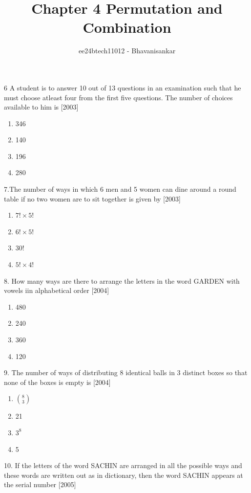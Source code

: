 \documentclass[journal,12pt,twocolumn]{IEEEtran}
\theoremstyle{remark}
\begin{document}

\vspace{3cm}

\title{Chapter 4 Permutation and Combination}
\author{ee24btech11012 - Bhavanisankar}
\maketitle
\newpage
\bigskip

\renewcommand{\thefigure}{\theenumi}
\renewcommand{\thetable}{\theenumi}

 6 A student is to answer 10 out of 13 questions in an examination such that he must choose atleast four from the first five questions. The number of choices available to him is  \hfill[2003]
\begin{enumerate} 
    \item  346
    \item  140 
    \item  196 
    \item  280
\end{enumerate}
7.The number of ways in which 6 men and 5 women can dine around a round table if no two women are to sit together is given by \hfill[2003]
\begin{enumerate}
 \item $7!\times5!$
 \item $6!\times 5!$
 \item $30!$
 \item $5!\times4!$
 \end{enumerate}
 8. How many ways are there to arrange the letters in the word GARDEN with vowels iin alphabetical order \hfill[2004]
 \begin{enumerate}
     \item 480
     \item 240
     \item 360
     \item 120
 \end{enumerate}
 9. The number of ways of distributing 8 identical balls in 3 distinct boxes so that none of the boxes is empty is \hfill[2004]
 \begin{enumerate}
     \item $ 8\choose3$
     \item 21
     \item $3^8$
     \item 5
 \end{enumerate}
 10. If the letters of the word SACHIN are arranged in all the possible ways and these words are written out as in dictionary, then the word SACHIN appears at the serial number \hfill[2005]
\end{document}

